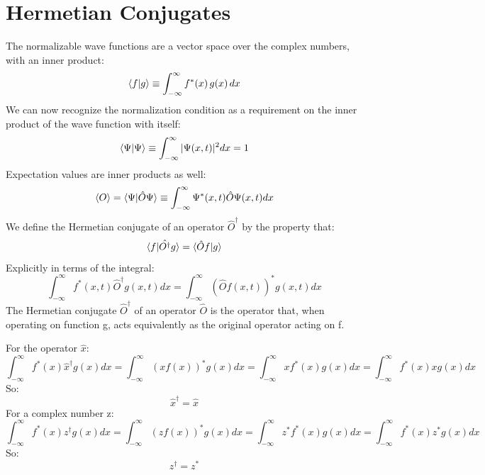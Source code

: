 \documentclass[12pt]{book}
\begin{document}
\section{Hermetian Conjugates}
The normalizable wave functions are a vector space over the complex numbers, with an inner product:
\begin{equation}
\braket{f|g} \equiv \int_{-\infty}^{\infty} f^*(x) \, g(x) \, dx
\end{equation}
We can now recognize the normalization condition as a requirement on the inner product of the wave function with itself:
\begin{equation}
\braket{\Psi|\Psi} \equiv \int_{-\infty}^{\infty} |\Psi(x,t)|^2 dx = 1
\end{equation}
Expectation values are inner products as well:
\begin{equation}
\braket{O} = \braket{\Psi|\hat{O}\Psi} \equiv \int_{-\infty}^{\infty} \Psi^*(x,t)\hat{O}\Psi(x,t) dx
\end{equation}
We define the Hermetian conjugate of an operator $\hat{O}^{\dagger}$ by the property that:
\begin{equation}
\braket{f|\hat{O^\dagger}g} = \braket{\hat{O} f| g}
\end{equation}
Explicitly in terms of the integral:
\begin{equation}
\int_{-\infty}^{\infty} f^*(x,t)\hat{O}^\dagger g(x,t) dx = 
\int_{-\infty}^{\infty} \left( \hat{O} f(x,t)\right)^* g(x,t) dx
\end{equation}
The Hermetian conjugate $\hat{O}^\dagger$ of an operator $\hat{O}$ is the operator that, when operating on function g, acts equivalently as the original operator acting on f.

For the operator $\hat{x}$:
\begin{equation*}
\int_{-\infty}^{\infty} f^*(x)\hat{x}^\dagger g(x) dx = 
\int_{-\infty}^{\infty} \left(x f(x)\right)^* g(x) dx = 
\int_{-\infty}^{\infty} x f^*(x) g(x) dx = 
\int_{-\infty}^{\infty} f^*(x) x g(x) dx 
\end{equation*}
So:
\begin{equation}
\hat{x}^\dagger = \hat{x}
\end{equation}
For a complex number z:
\begin{equation*}
\int_{-\infty}^{\infty} f^*(x)z^\dagger g(x) dx = 
\int_{-\infty}^{\infty} \left(z f(x)\right)^* g(x) dx = 
\int_{-\infty}^{\infty} z^* f^*(x) g(x) dx = 
\int_{-\infty}^{\infty} f^*(x) z^* g(x) dx 
\end{equation*}
So:
\begin{equation}
z^\dagger = z^*
\end{equation}
\end{document}

